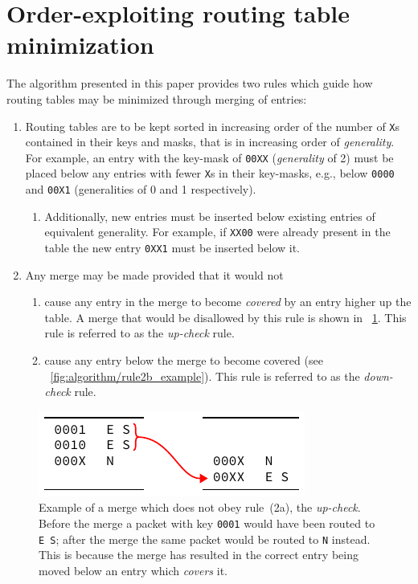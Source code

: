 \documentclass[conference]{IEEEtran}
\newcommand{\mytt}[1]{\texttt{\footnotesize#1}}
\begin{document}
  \section{Order-exploiting routing table minimization}

  The algorithm presented in this paper provides two rules which guide how routing tables may be minimized through merging of entries:

  \begin{enumerate}[\IEEEsetlabelwidth{2)}]
    \item Routing tables are to be kept sorted in increasing order of the number of \mytt{X}s contained in their keys and masks, that is in increasing order of \textit{generality}.
      For example, an entry with the key-mask of \mytt{00XX} (\textit{generality} of 2) must be placed below any entries with fewer \mytt{X}s in their key-masks, e.g., below \mytt{0000} and \mytt{00X1} (generalities of 0 and 1 respectively).
      \begin{enumerate}[\IEEEsetlabelwidth{a)}]
        \item Additionally, new entries must be inserted below existing entries of equivalent generality.
              For example, if \mytt{XX00} were already present in the table the new entry \mytt{0XX1} must be inserted below it.
      \end{enumerate}
    \item Any merge may be made provided that it would not
      \begin{enumerate}[\IEEEsetlabelwidth{b)}]
        \item cause any entry in the merge to become \textit{covered} by an entry higher up the table.
              A merge that would be disallowed by this rule is shown in \figurename~\ref{fig:algorithm/rule2a_example}.
              This rule is referred to as the \textit{up-check} rule.
        \item cause any entry below the merge to become covered (see \figurename~\ref{fig:algorithm/rule2b_example}).
              This rule is referred to as the \textit{down-check} rule.
      \end{enumerate}
  \end{enumerate}

  \begin{figure}
    \centering
    \includegraphics{figures/rule2a_example}
    \caption{
      Example of a merge which does not obey rule~(2a), the \textit{up-check}.
      Before the merge a packet with key \mytt{0001} would have been routed to \mytt{E~S}; after the merge the same packet would be routed to \mytt{N} instead.
      This is because the merge has resulted in the correct entry being moved below an entry which \textit{covers} it.
    }
    \label{fig:algorithm/rule2a_example}
  \end{figure}
\end{document}
